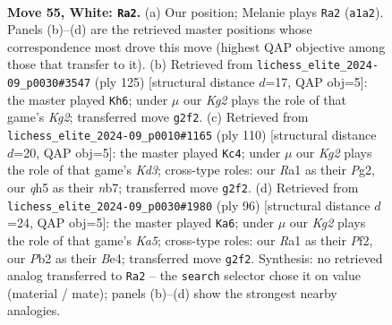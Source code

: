 \documentclass[11pt]{article}
\begin{document}
\clearpage

\begin{figure}[p]\centering
\begin{subfigure}{0.46\textwidth}\centering
\resizebox{\linewidth}{!}{%
\newchessgame
\chessboard[
  setfen={6k1/p7/1p6/4np1q/P1p5/6P1/1P4K1/R7 w - - 0 55},
  showmover=false,
  pgfstyle=straightmove, color=movearrow, markmove={a1-a2}
]}
\caption{}
\end{subfigure}\hfill
\begin{subfigure}{0.46\textwidth}\centering
\resizebox{\linewidth}{!}{%
\newchessgame
\chessboard[
  setfen={2Q5/6k1/6p1/3K4/p5P1/P4P2/3N4/8 b - - 0 63},
  showmover=false,
  pgfstyle=straightmove, color=movearrow, markmove={g7-h6}
]}
\caption{}
\end{subfigure}
\\[4pt]
\begin{subfigure}{0.46\textwidth}\centering
\resizebox{\linewidth}{!}{%
\newchessgame
\chessboard[
  setfen={8/1nB3p1/p3k2p/2p5/8/2PK3P/6P1/8 w - - 5 56},
  showmover=false,
  pgfstyle=straightmove, color=movearrow, markmove={d3-c4}
]}
\caption{}
\end{subfigure}\hfill
\begin{subfigure}{0.46\textwidth}\centering
\resizebox{\linewidth}{!}{%
\newchessgame
\chessboard[
  setfen={8/2p1k3/3p4/KP6/3PBn2/7p/5P2/8 w - - 0 49},
  showmover=false,
  pgfstyle=straightmove, color=movearrow, markmove={a5-a6}
]}
\caption{}
\end{subfigure}
\caption{\textbf{Move 55, White: \texttt{Ra2}.} (a) Our position; Melanie plays \texttt{Ra2} (\texttt{a1a2}). Panels (b)--(d) are the retrieved master positions whose correspondence most drove this move (highest QAP objective among those that transfer to it). (b) Retrieved from \texttt{lichess\_elite\_2024-09\_p0030\#3547} (ply 125) [structural distance $d$=17, QAP obj=5]: the master played \texttt{Kh6}; under $\mu$ our \emph{Kg2} plays the role of that game's \emph{Kg2}; transferred move \texttt{g2f2}. (c) Retrieved from \texttt{lichess\_elite\_2024-09\_p0010\#1165} (ply 110) [structural distance $d$=20, QAP obj=5]: the master played \texttt{Kc4}; under $\mu$ our \emph{Kg2} plays the role of that game's \emph{Kd3}; cross-type roles: our \emph{R}a1 as their \emph{P}g2, our \emph{q}h5 as their \emph{n}b7; transferred move \texttt{g2f2}. (d) Retrieved from \texttt{lichess\_elite\_2024-09\_p0030\#1980} (ply 96) [structural distance $d$=24, QAP obj=5]: the master played \texttt{Ka6}; under $\mu$ our \emph{Kg2} plays the role of that game's \emph{Ka5}; cross-type roles: our \emph{R}a1 as their \emph{P}f2, our \emph{P}b2 as their \emph{B}e4; transferred move \texttt{g2f2}. Synthesis: no retrieved analog transferred to \texttt{Ra2} -- the \texttt{search} selector chose it on value (material / mate); panels (b)--(d) show the strongest nearby analogies.}
\label{fig:thought-m108}
\end{figure}
\end{document}
